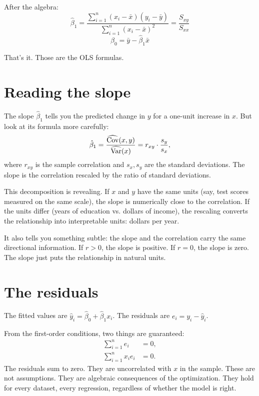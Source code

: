 After the algebra:
\begin{equation}
  \boxed{\hat\beta_1 = \frac{\displaystyle\sum_{i=1}^{n}(x_i - \bar{x})(y_i - \bar{y})}{\displaystyle\sum_{i=1}^{n}(x_i - \bar{x})^2} = \frac{S_{xy}}{S_{xx}}}
  \label{eq:beta1}
\end{equation}
\begin{equation}
  \boxed{\hat\beta_0 = \bar{y} - \hat\beta_1 \bar{x}}
  \label{eq:beta0}
\end{equation}

That's it. Those are the OLS formulas.

\section{Reading the slope}

The slope $\hat\beta_1$ tells you the predicted change in $y$ for a one-unit increase in $x$. But look at its formula more carefully:
\[
  \hat\beta_1 = \frac{\widehat{\operatorname{Cov}}(x, y)}{\widehat{\operatorname{Var}}(x)} = r_{xy} \cdot \frac{s_y}{s_x},
\]
where $r_{xy}$ is the sample correlation and $s_x, s_y$ are the standard deviations. The slope is the correlation rescaled by the ratio of standard deviations.

This decomposition is revealing. If $x$ and $y$ have the same units (say, test scores measured on the same scale), the slope is numerically close to the correlation. If the units differ (years of education vs. dollars of income), the rescaling converts the relationship into interpretable units: dollars per year.

It also tells you something subtle: the slope and the correlation carry the same directional information. If $r > 0$, the slope is positive. If $r = 0$, the slope is zero. The slope just puts the relationship in natural units.

\section{The residuals}

The fitted values are $\hat{y}_i = \hat\beta_0 + \hat\beta_1 x_i$. The residuals are $e_i = y_i - \hat{y}_i$.

From the first-order conditions, two things are guaranteed:
\begin{align}
  \sum_{i=1}^{n} e_i &= 0, \label{eq:resid-zero} \\
  \sum_{i=1}^{n} x_i e_i &= 0. \label{eq:resid-ortho}
\end{align}
The residuals sum to zero. They are uncorrelated with $x$ in the sample. These are not assumptions. They are algebraic consequences of the optimization. They hold for every dataset, every regression, regardless of whether the model is right.

